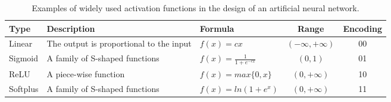 \begin{table}[!b]
\centering
\caption{Examples of widely used activation functions in the design of an artificial neural network.}
\label{tab:active_function}
\begin{adjustbox}{width=0.5\textwidth}
\label{tab:transfer_function}
	\begin{tabular}{lllcc}
			\toprule
			Type & Description  & Formula & Range              & Encoding\\
			\midrule
			Linear   & The output is proportional to the input & $f(x)=cx$                  &  $(-\infty, +\infty)$ & 00\\
			Sigmoid  & A family of S-shaped functions          & $f(x)=\frac{1}{1+e^{-cx}}$ & $(0, 1)$              & 01\\
			ReLU     & A piece-wise function                   & $f(x)= max\{0,x\}$           & $(0, +\infty)$        & 10\\
			Softplus & A family of S-shaped functions          & $f(x) = ln(1+e^x)$         & $(0, +\infty)$        & 11\\
			\bottomrule
	\end{tabular}
\end{adjustbox}
\end{table}
